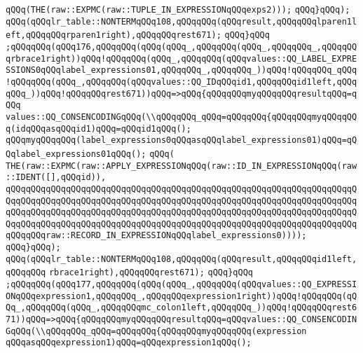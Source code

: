 \verb|qQQq(THE(raw::EXPMC(raw::TUPLE_IN_EXPRESSIONqQQqexps2)));|\newline
\verb|qQQq}qQQq);|\newline
\verb|qQQq(qQQqlr_table::NONTERMqQQq108,qQQqqQQq(qQQqresult,qQQqqQQqlparen1left,qQQqqQQqrparen1right),qQQqqQQqrest671);|\newline
\verb|qQQq}qQQq|\newline
\verb|;qQQqqQQq(qQQq176,qQQqqQQq(qQQq(qQQq_,qQQqqQQq(qQQq_,qQQqqQQq_,qQQqqQQqrbrace1right))qQQq!qQQqqQQq(qQQq_,qQQqqQQq(qQQqvalues::QQ_LABEL_EXPRESSIONS0qQQqlabel_expressions01,qQQqqQQq_,qQQqqQQq_))qQQq!qQQqqQQq_qQQq!qQQqqQQq(qQQq_,qQQqqQQq(qQQqvalues::QQ_IDqQQqid1,qQQqqQQqid1left,qQQqqQQq_))qQQq!qQQqqQQqrest671))qQQq=>qQQq{qQQqqQQqmyqQQqqQQqresultqQQq=qQQq|\newline
\verb|values::QQ_CONSENCODINGqQQq(\\qQQqqQQq_qQQq=qQQqqQQq{qQQqqQQqmyqQQqqQQq(idqQQqasqQQqid1)qQQq=qQQqid1qQQq();|\newline
\verb|qQQqmyqQQqqQQq(label_expressions0qQQqasqQQqlabel_expressions01)qQQq=qQQqlabel_expressions01qQQq();|\newline
\verb|qQQq(|\newline
\verb|THE(raw::EXPMC(raw::APPLY_EXPRESSIONqQQq(raw::ID_IN_EXPRESSIONqQQq(raw::IDENT([],qQQqid)),|\newline
\verb|qQQqqQQqqQQqqQQqqQQqqQQqqQQqqQQqqQQqqQQqqQQqqQQqqQQqqQQqqQQqqQQqqQQqqQQqqQQqqQQqqQQqqQQqqQQqqQQqqQQqqQQqqQQqqQQqqQQqqQQqqQQqqQQqqQQqqQQqqQQqqQQqqQQqqQQqqQQqqQQqqQQqqQQqqQQqqQQqqQQqqQQqqQQqqQQqqQQqqQQqqQQqqQQqqQQqqQQqqQQqqQQqqQQqqQQqqQQqqQQqqQQqqQQqqQQqqQQqqQQqqQQqqQQqqQQqqQQqqQQqqQQqqQQqraw::RECORD_IN_EXPRESSIONqQQqlabel_expressions0))));|\newline
\verb|qQQq}qQQq);|\newline
\verb|qQQq(qQQqlr_table::NONTERMqQQq108,qQQqqQQq(qQQqresult,qQQqqQQqid1left,qQQqqQQq|\newline
\verb|rbrace1right),qQQqqQQqrest671);|\newline
\verb|qQQq}qQQq|\newline
\verb|;qQQqqQQq(qQQq177,qQQqqQQq(qQQq(qQQq_,qQQqqQQq(qQQqvalues::QQ_EXPRESSIONqQQqexpression1,qQQqqQQq_,qQQqqQQqexpression1right))qQQq!qQQqqQQq(qQQq_,qQQqqQQq(qQQq_,qQQqqQQqmc_colon1left,qQQqqQQq_))qQQq!qQQqqQQqrest671))qQQq=>qQQq{qQQqqQQqmyqQQqqQQqresultqQQq=qQQqvalues::QQ_CONSENCODINGqQQq(\\qQQqqQQq_qQQq=qQQqqQQq{qQQqqQQqmyqQQqqQQq(expression|\newline
\verb|qQQqasqQQqexpression1)qQQq=qQQqexpression1qQQq();|\newline
